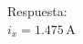 \documentclass[letterpaper,12pt]{article}
\begin{document}
\begin{enumerate}
    \vspace{0.35cm}
    \noindent\hspace*{-\leftmargin}Respuesta:\\
    \noindent\hspace*{-\leftmargin}\textbf{$i_x=1.475\,\mathrm{A}$}
    \vspace{0.25cm}

\end{enumerate}
\end{document}
